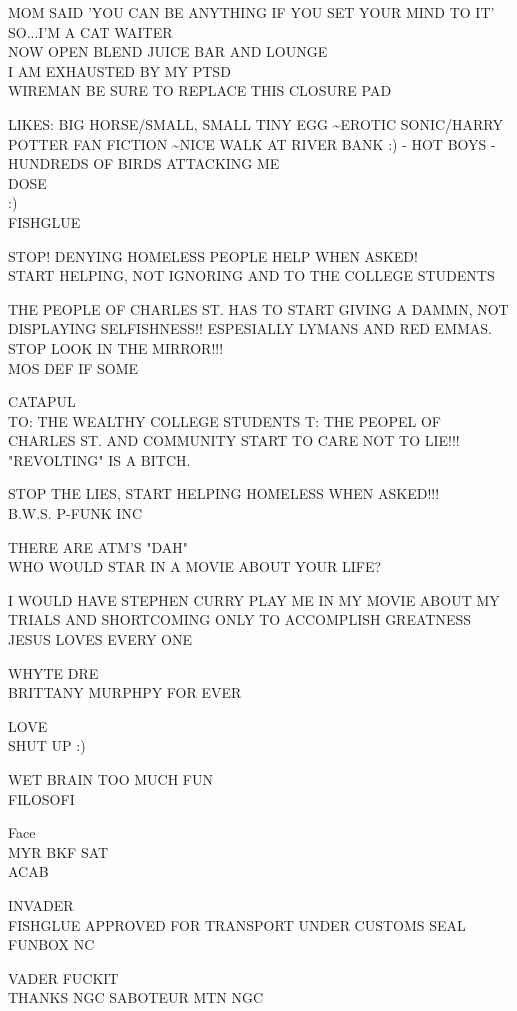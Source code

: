 \documentclass[10pt,letterpaper]{article}
\begin{document}
MOM SAID 'YOU CAN BE ANYTHING IF YOU SET YOUR MIND TO IT' SO...I'M A CAT WAITER\\
NOW OPEN BLEND JUICE BAR AND LOUNGE\\
I AM EXHAUSTED BY MY PTSD\\
WIREMAN BE SURE TO REPLACE THIS CLOSURE PAD

LIKES: BIG HORSE/SMALL, SMALL TINY EGG \textasciitilde{}EROTIC SONIC/HARRY POTTER FAN FICTION \textasciitilde{}NICE WALK AT RIVER BANK :) {-} HOT BOYS {-} HUNDREDS OF BIRDS ATTACKING ME\\
DOSE\\
:)\\
FISHGLUE

STOP! DENYING HOMELESS PEOPLE HELP WHEN ASKED!\\
START HELPING, NOT IGNORING  AND TO THE COLLEGE STUDENTS

THE PEOPLE OF CHARLES ST. HAS TO START GIVING A DAMMN, NOT DISPLAYING SELFISHNESS!! ESPESIALLY LYMANS AND RED EMMAS.  STOP LOOK IN THE MIRROR!!!\\
MOS DEF IF SOME

CATAPUL\\
TO: THE WEALTHY COLLEGE STUDENTS   T: THE PEOPEL OF CHARLES ST. AND COMMUNITY START TO CARE NOT TO LIE!!! "REVOLTING" IS A BITCH.

STOP THE LIES, START HELPING HOMELESS WHEN ASKED!!!\\
B.W.S. P{-}FUNK INC

THERE ARE ATM'S "DAH"\\
WHO WOULD STAR IN A MOVIE ABOUT YOUR LIFE?

I WOULD HAVE STEPHEN CURRY PLAY ME IN MY MOVIE ABOUT MY TRIALS AND SHORTCOMING ONLY TO ACCOMPLISH GREATNESS\\
JESUS LOVES EVERY ONE

WHYTE DRE\\
BRITTANY MURPHPY FOR EVER

LOVE\\
SHUT UP :)

WET BRAIN TOO MUCH FUN\\
FILOSOFI

Face\\
MYR BKF SAT\\
ACAB

INVADER\\
FISHGLUE APPROVED FOR TRANSPORT UNDER CUSTOMS SEAL\\
FUNBOX NC

VADER FUCKIT\\
THANKS NGC SABOTEUR MTN NGC
\end{document}
